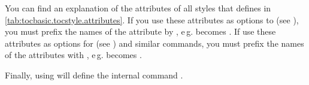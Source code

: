 You can find an explanation of the attributes of all styles that
 defines in \autoref{tab:tocbasic.tocstyle.attributes}.
If you use these attributes as
options to  (see
), you must prefix the names of the
attribute by , e\,g.  becomes
. If use
these attributes as options for
%
%
 (see
) and similar commands,
you must prefix the names of the attributes with , e\,g.
 becomes .

Finally, using  will define the internal command
.

